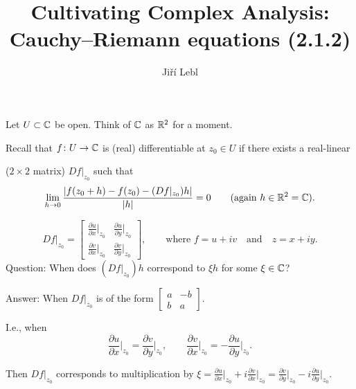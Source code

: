\documentclass[10pt,aspectratio=169]{beamer}
\author{Ji\v{r}\'i Lebl}
\institute[OSU]{%
Departemento pri Matematiko de Oklahoma {\^S}tata Universitato}
\title{Cultivating Complex Analysis:\\%
Cauchy--Riemann equations (2.1.2)}
\date{}
\begin{document}
\begin{frame}
\titlepage
\end{frame}

\begin{frame}
Let $U \subset {\mathbb{C}}$ be open.  Think of ${\mathbb{C}}$ as ${\mathbb{R}}^2$ for a moment.

\pause
\medskip

Recall that $f \colon U \to {\mathbb{C}}$ is (real) differentiable at $z_0 \in U$ if
there exists a real-linear

($2\times 2$ matrix) $Df|_{z_0}$ such that
\[
\lim_{h \to 0} \frac{\lvert {f(z_0+h) - f(z_0) - (Df|_{z_0}) h} \rvert}{\lvert {h} \rvert} = 0 
\qquad \text{(again $h\in {\mathbb{R}}^2={\mathbb{C}}$).}
\]

\pause

\[
Df|_{z_0} =
\begin{bmatrix}
\frac{\partial u}{\partial x}\big|_{z_0} & \frac{\partial u}{\partial
y}\big|_{z_0} \\[5pt]
\frac{\partial v}{\partial x}\big|_{z_0} & \frac{\partial v}{\partial y}\big|_{z_0}
\end{bmatrix} ,
\qquad \text{where }
f= u + iv
\quad \text{and} \quad
z=x+iy. 
\]
\pause
Question: When does $(Df|_{z_0})h$ correspond to $\xi h$ for some $\xi \in {\mathbb{C}}$?

\medskip
\pause

Answer: When $Df|_{z_0}$ is of the form
$\left[ \begin{smallmatrix}
a & -b \\ b & a
\end{smallmatrix} \right]$.

\medskip
\pause

I.e., when
\[
\frac{\partial u}{\partial x}\Big|_{z_0} =
\frac{\partial v}{\partial y}\Big|_{z_0}
, \qquad
\frac{\partial v}{\partial x}\Big|_{z_0} =
-\frac{\partial u}{\partial y}\Big|_{z_0} .
\]

\pause
Then
$Df|_{z_0}$ corresponds to multiplication by 
$\xi = \frac{\partial u}{\partial x}\big|_{z_0} + i \frac{\partial v}{\partial
x}\big|_{z_0} = \frac{\partial v}{\partial y}\big|_{z_0} - i \frac{\partial u}{\partial
y}\big|_{z_0}$.

\end{frame}
\end{document}
